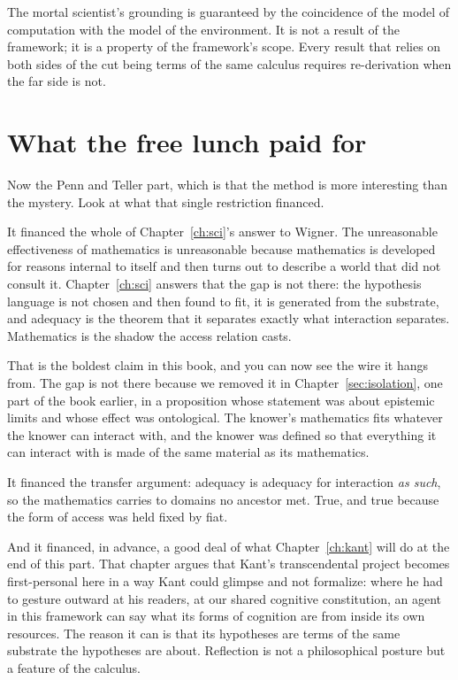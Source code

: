 \begin{observation}
\label{obs:sidestep}
The mortal scientist's grounding is guaranteed by the coincidence
of the model of computation with the model of the environment.
It is not a result of the framework; it is a property of the
framework's scope.
Every result that relies on both sides of the cut being terms of
the same calculus requires re-derivation when the far side is not.
\end{observation}

\section{What the free lunch paid for}
\label{sec:what-it-bought}

Now the Penn and Teller part, which is that the method is more
interesting than the mystery.
Look at what that single restriction financed.

It financed the whole of Chapter~\ref{ch:sci}'s answer to Wigner.
The unreasonable effectiveness of mathematics is unreasonable
because mathematics is developed for reasons internal to itself and
then turns out to describe a world that did not consult it.
Chapter~\ref{ch:sci} answers that the gap is not there: the
hypothesis language is not chosen and then found to fit, it is
generated from the substrate, and adequacy is the theorem that it
separates exactly what interaction separates.
Mathematics is the shadow the access relation casts.

That is the boldest claim in this book, and you can now see the
wire it hangs from.
The gap is not there because we removed it in
Chapter~\ref{sec:isolation}, one part of the book earlier, in a
proposition whose statement was about epistemic limits and whose
effect was ontological.
The knower's mathematics fits whatever the knower can interact
with, and the knower was defined so that everything it can interact
with is made of the same material as its mathematics.

It financed the transfer argument: adequacy is adequacy for
interaction \emph{as such}, so the mathematics carries to domains
no ancestor met.
True, and true because the form of access was held fixed by fiat.

And it financed, in advance, a good deal of what
Chapter~\ref{ch:kant} will do at the end of this part.
That chapter argues that Kant's transcendental project becomes
first-personal here in a way Kant could glimpse and not formalize:
where he had to gesture outward at his readers, at our shared
cognitive constitution, an agent in this framework can say what its
forms of cognition are from inside its own resources.
The reason it can is that its hypotheses are terms of the same
substrate the hypotheses are about.
Reflection is not a philosophical posture but a feature of the
calculus.

